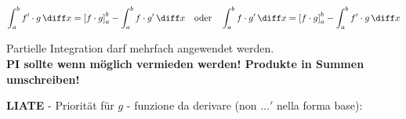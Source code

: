 \[\int_{a}^{b} f'\cdot g \, \diff x = \left[ f\cdot g \right]_{a}^{b} - \int_{a}^{b} f\cdot g' \, \diff x
\quad \text{oder} \quad
\int_{a}^{b} f\cdot g' \, \diff x = \left[ f\cdot g \right]_{a}^{b} - \int_{a}^{b} f' \cdot g \, \diff x
\]

Partielle Integration darf mehrfach angewendet werden. \\
\textbf{PI sollte wenn möglich vermieden werden! Produkte in Summen umschreiben!}\vspace{1em}

\textbf{LIATE} - Priorität für $g$ - funzione da derivare (non $\dots'$ nella forma base):













